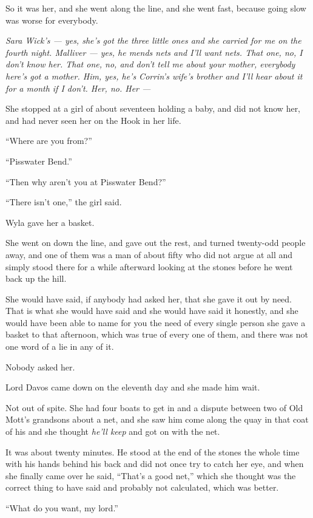 So it was her, and she went along the line, and she went fast, because going slow was worse for everybody.

\textit{Sara Wick’s — yes, she’s got the three little ones and she carried for me on the fourth night. Malliver — yes, he mends nets and I’ll want nets. That one, no, I don’t know her. That one, no, and don’t tell me about your mother, everybody here’s got a mother. Him, yes, he’s Corrin’s wife’s brother and I’ll hear about it for a month if I don’t. Her, no. Her — }

She stopped at a girl of about seventeen holding a baby, and did not know her, and had never seen her on the Hook in her life.

“Where are you from?”

“Pisswater Bend.”

“Then why aren’t you at Pisswater Bend?”

“There isn’t one,” the girl said.

Wyla gave her a basket.

She went on down the line, and gave out the rest, and turned twenty-odd people away, and one of them was a man of about fifty who did not argue at all and simply stood there for a while afterward looking at the stones before he went back up the hill.

She would have said, if anybody had asked her, that she gave it out by need. That is what she would have said and she would have said it honestly, and she would have been able to name for you the need of every single person she gave a basket to that afternoon, which was true of every one of them, and there was not one word of a lie in any of it.

Nobody asked her.

\sceneBreak

Lord Davos came down on the eleventh day and she made him wait.

Not out of spite. She had four boats to get in and a dispute between two of Old Mott’s grandsons about a net, and she saw him come along the quay in that coat of his and she thought \textit{he’ll keep} and got on with the net.

It was about twenty minutes. He stood at the end of the stones the whole time with his hands behind his back and did not once try to catch her eye, and when she finally came over he said, “That’s a good net,” which she thought was the correct thing to have said and probably not calculated, which was better.

“What do you want, my lord.”

